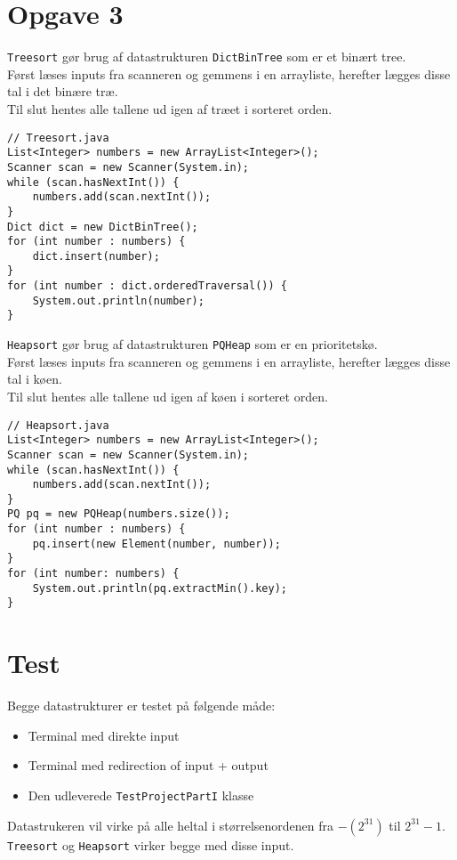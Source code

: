 \documentclass{article}
\begin{document}
\section*{Opgave 3}
\texttt{Treesort} gør brug af datastrukturen \texttt{DictBinTree} som er et binært tree.\\
Først læses inputs fra scanneren og gemmens i en arrayliste, herefter lægges disse tal i det binære træ.\\
Til slut hentes alle tallene ud igen af træet i sorteret orden.
\begin{lstlisting}
// Treesort.java
List<Integer> numbers = new ArrayList<Integer>();
Scanner scan = new Scanner(System.in);
while (scan.hasNextInt()) {
	numbers.add(scan.nextInt());
}
Dict dict = new DictBinTree();
for (int number : numbers) {
	dict.insert(number);
}
for (int number : dict.orderedTraversal()) {
	System.out.println(number);
}
\end{lstlisting}
\texttt{Heapsort} gør brug af datastrukturen \texttt{PQHeap} som er en prioritetskø.\\
Først læses inputs fra scanneren og gemmens i en arrayliste, herefter lægges disse tal i køen.\\
Til slut hentes alle tallene ud igen af køen i sorteret orden.
\begin{lstlisting}
// Heapsort.java
List<Integer> numbers = new ArrayList<Integer>();
Scanner scan = new Scanner(System.in);
while (scan.hasNextInt()) {
	numbers.add(scan.nextInt());
}
PQ pq = new PQHeap(numbers.size());
for (int number : numbers) {
	pq.insert(new Element(number, number));
}
for (int number: numbers) {
	System.out.println(pq.extractMin().key);
}
\end{lstlisting}
\newpage
\section*{Test}
Begge datastrukturer er testet på følgende måde:
\begin{itemize}
  \item Terminal med direkte input
  \item Terminal med redirection of input + output  
  \item Den udleverede \texttt{TestProjectPartI} klasse
\end{itemize}
\bigskip
Datastrukeren vil virke på alle heltal i størrelsenordenen fra $-(2^{31})$ til $2^{31}-1$. \texttt{Treesort} og \texttt{Heapsort} virker begge med disse input.
\end{document}
